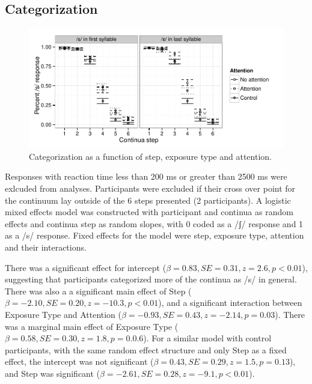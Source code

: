 \documentclass[a4paper,11pt,twocolumn]{article}
\begin{document}
\subsection{Categorization}

\begin{figure}[!ht]
\caption{Categorization as a function of step, exposure type and attention.}\label{fig:categ}
\begin{center}
\includegraphics[width=\textwidth]{categresults}
\end{center}
\end{figure}

Responses with reaction time less than 200 ms or greater than 2500 ms were exlcuded from analyses.  Participants were excluded if their cross over point for the continuum lay outside of the 6 steps presented (2 participants).  A logistic mixed effects model was constructed with participant and continua as random effects and continua step as random slopes, with 0 coded as a /ʃ/ response and 1 as a /s/ response.  Fixed effects for the model were step, exposure type, attention and their interactions.

There was a significant effect for intercept ($\beta = 0.83, SE = 0.31, z = 2.6, p < 0.01$), suggesting that participants categorized more of the continua as /s/ in general.  There was also a a significant main effect of Step ($\beta = -2.10, SE = 0.20, z = -10.3, p < 0.01$), and a significant interaction between Exposure Type and Attention ($\beta = -0.93, SE = 0.43, z = -2.14, p = 0.03$).  There was a marginal main effect of Exposure Type ($\beta =0.58 , SE = 0.30, z = 1.8, p = 0.0.6$).  For a similar model with control participants, with the same random effect structure and only Step as a fixed effect, the intercept was not significant ($\beta = 0.43, SE = 0.29, z = 1.5, p = 0.13$), and Step was significant ($\beta = -2.61, SE = 0.28, z = -9.1, p < 0.01$).
\end{document}
